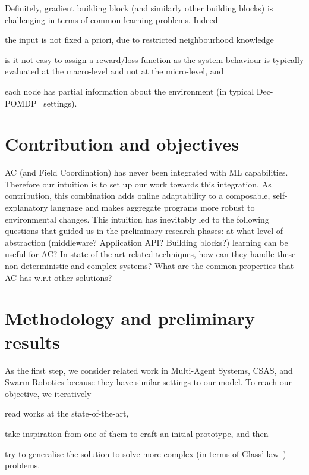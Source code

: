 \documentclass[conference]{IEEEtran}
\begin{document}
Definitely, gradient building block (and similarly other building blocks) is challenging in terms of common learning problems. Indeed
\begin{enumerate*}[label=(\roman*)]
\item the input is not fixed a priori, due to restricted neighbourhood knowledge
\item is it not easy to assign a reward/loss function as the system behaviour is typically evaluated at the macro-level and not at the micro-level, and
\item each node has partial information about the environment (in typical Dec-POMDP~\cite{DBLP:conf/uai/BernsteinZI00} settings).
\end{enumerate*}
\section{Contribution and objectives}
AC (and Field Coordination) has never been integrated with ML capabilities.
%
Therefore our intuition is to set up our work towards this integration.
%
As contribution, this combination adds online adaptability to a composable, self-explanatory language and makes aggregate programs more robust to environmental changes.
%
This intuition has inevitably led to the following questions that guided us in the preliminary research phases: 
at what level of abstraction (middleware? Application API? Building blocks?) learning can be useful for AC?
%
In state-of-the-art related techniques, how can they handle these non-deterministic and complex systems?
%
What are the common properties that AC has w.r.t other solutions?
\section{Methodology and preliminary results}
%
As the first step, we consider related work in Multi-Agent Systems, CSAS, and Swarm Robotics because they have similar settings to our model.
To reach our objective, we iteratively 
\begin{enumerate*}[label=(\roman*)]
\item read works at the state-of-the-art,
\item take inspiration from one of them to craft an initial prototype, and then
\item try to generalise the solution to solve more complex (in terms of Glass' law~\cite{DBLP:journals/software/Glass01}) problems.
\end{enumerate*}
\end{document}
